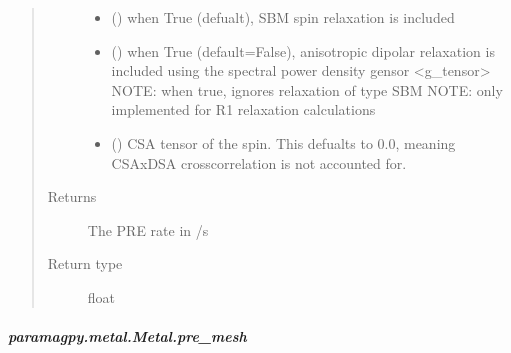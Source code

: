 \documentclass[a4paper,10pt,english,openany,oneside]{sphinxmanual}
\begin{document}
\begin{fulllineitems}
\begin{fulllineitems}
\begin{fulllineitems}
\begin{quote}
\begin{description}
\begin{itemize}
\item {} 
 (\sphinxstyleliteralemphasis{\sphinxupquote{ (}}\sphinxstyleliteralemphasis{\sphinxupquote{)}}) \textendash{} when True (defualt), SBM spin relaxation is included

\item {} 
 (\sphinxstyleliteralemphasis{\sphinxupquote{ (}}\sphinxstyleliteralemphasis{\sphinxupquote{)}}) \textendash{} when True (default=False), anisotropic dipolar relaxation is
included using the spectral power density gensor \textless{}g\_tensor\textgreater{}
NOTE: when true, ignores relaxation of type SBM
NOTE: only implemented for R1 relaxation calculations

\item {} 
 (\sphinxstyleliteralemphasis{\sphinxupquote{ (}}\sphinxstyleliteralemphasis{\sphinxupquote{,}}\sphinxstyleliteralemphasis{\sphinxupquote{) }}\sphinxstyleliteralemphasis{\sphinxupquote{(}}\sphinxstyleliteralemphasis{\sphinxupquote{)}}) \textendash{} CSA tensor of the spin.
This defualts to 0.0, meaning CSAxDSA crosscorrelation is
not accounted for.

\end{itemize}

\item[{Returns}] \leavevmode
{} \textendash{} The PRE rate in /s

\item[{Return type}] \leavevmode
float

\end{description}\end{quote}

\end{fulllineitems}



\subparagraph{paramagpy.metal.Metal.pre\_mesh}
\label{\detokenize{reference/generated/paramagpy.metal.Metal.pre_mesh:paramagpy-metal-metal-pre-mesh}}\label{\detokenize{reference/generated/paramagpy.metal.Metal.pre_mesh::doc}}


\end{fulllineitems}
\end{fulllineitems}
\end{document}
